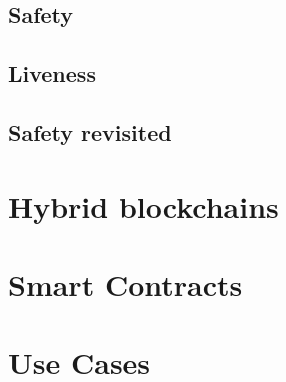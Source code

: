 \documentclass[a4paper,11pt]{report}
\begin{document}
	\section{Safety}
	\label{sec:safe1}
	
	
	\section{Liveness}
	\label{sec:live}
	
	
	\section{Safety revisited}
	\label{sec:safe2}
	

\chapter{Hybrid blockchains}
	\label{ch:hybrid}
	

\chapter{Smart Contracts}
	


\chapter{Use Cases}
	\label{ch:useCases}
	
\end{document}
